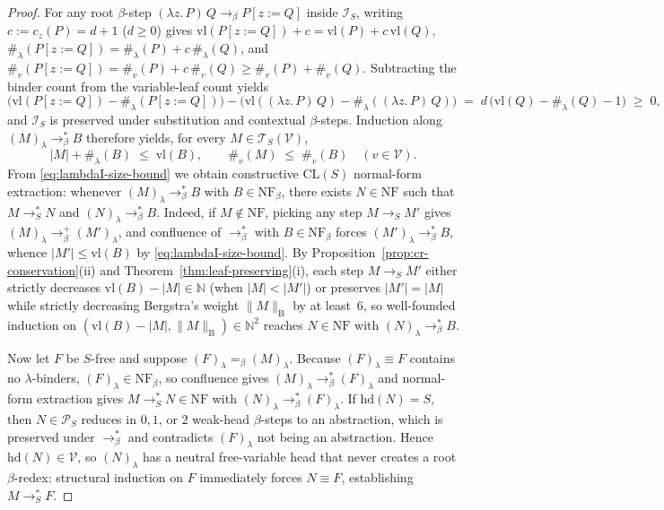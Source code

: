 \documentclass[11pt,reqno]{amsart}
\numberwithin{equation}{section}
\theoremstyle{plain}
\theoremstyle{definition}
\theoremstyle{remark}
\newcommand{\CLS}{\mathrm{CL}(S)}
\newcommand{\TSV}{\mathcal{T}_S(\mathcal{V})}
\newcommand{\NF}{\mathrm{NF}}
\newcommand{\redS}{\to_S}
\newcommand{\redSs}{\to_S^*}
\begin{document}
\begin{proof}
For any root $\beta$-step $(\lambda z.\, P)\,Q \to_\beta P[z := Q]$ inside $\mathcal{I}_S$, writing $c := c_z(P) = d + 1$ ($d \ge 0$) gives $\mathrm{vl}(P[z := Q]) + c = \mathrm{vl}(P) + c\,\mathrm{vl}(Q)$, $\#_\lambda(P[z := Q]) = \#_\lambda(P) + c\,\#_\lambda(Q)$, and $\#_v(P[z := Q]) = \#_v(P) + c\,\#_v(Q) \ge \#_v(P) + \#_v(Q)$. Subtracting the binder count from the variable-leaf count yields
\[
  \bigl(\mathrm{vl}(P[z := Q]) - \#_\lambda(P[z := Q])\bigr) - \bigl(\mathrm{vl}((\lambda z.\, P)\,Q) - \#_\lambda((\lambda z.\, P)\,Q)\bigr) \;=\; d\,\bigl(\mathrm{vl}(Q) - \#_\lambda(Q) - 1\bigr) \;\ge\; 0,
\]
and $\mathcal{I}_S$ is preserved under substitution and contextual $\beta$-steps. Induction along $(M)_\lambda \to_\beta^* B$ therefore yields, for every $M \in \TSV$,
\begin{equation}\label{eq:lambdaI-size-bound}
  |M| + \#_\lambda(B) \;\le\; \mathrm{vl}(B), \qquad \#_v(M) \;\le\; \#_v(B) \quad (v \in \mathcal{V}).
\end{equation}
From \eqref{eq:lambdaI-size-bound} we obtain constructive $\CLS$ normal-form extraction: whenever $(M)_\lambda \to_\beta^* B$ with $B \in \NF_\beta$, there exists $N \in \NF$ such that $M \redSs N$ and $(N)_\lambda \to_\beta^* B$. Indeed, if $M \notin \NF$, picking any step $M \redS M'$ gives $(M)_\lambda \to_\beta^+ (M')_\lambda$, and confluence of $\to_\beta^*$ with $B \in \NF_\beta$ forces $(M')_\lambda \to_\beta^* B$, whence $|M'| \le \mathrm{vl}(B)$ by \eqref{eq:lambdaI-size-bound}. By Proposition~\ref{prop:cr-conservation}(ii) and Theorem~\ref{thm:leaf-preserving}(i), each step $M \redS M'$ either strictly decreases $\mathrm{vl}(B) - |M| \in \mathbb{N}$ (when $|M| < |M'|$) or preserves $|M'| = |M|$ while strictly decreasing Bergstra's weight $\|M\|_{\mathrm{B}}$ by at least~$6$, so well-founded induction on $(\mathrm{vl}(B) - |M|, \|M\|_{\mathrm{B}}) \in \mathbb{N}^2$ reaches $N \in \NF$ with $(N)_\lambda \to_\beta^* B$.

Now let $F$ be $S$-free and suppose $(F)_\lambda =_\beta (M)_\lambda$. Because $(F)_\lambda \equiv F$ contains no $\lambda$-binders, $(F)_\lambda \in \NF_\beta$, so confluence gives $(M)_\lambda \to_\beta^* (F)_\lambda$ and normal-form extraction gives $M \redSs N \in \NF$ with $(N)_\lambda \to_\beta^* (F)_\lambda$. If $\mathrm{hd}(N) = S$, then $N \in \mathcal{P}_S$ reduces in $0, 1$, or $2$ weak-head $\beta$-steps to an abstraction, which is preserved under $\to_\beta^*$ and contradicts $(F)_\lambda$ not being an abstraction. Hence $\mathrm{hd}(N) \in \mathcal{V}$, so $(N)_\lambda$ has a neutral free-variable head that never creates a root $\beta$-redex: structural induction on $F$ immediately forces $N \equiv F$, establishing $M \redSs F$.


\end{proof}
\end{document}
